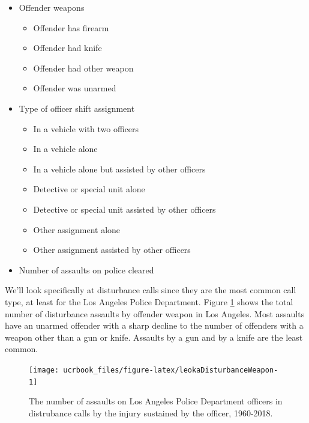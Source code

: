 \documentclass[
  12pt,
  openany]{book}
\providecommand{\tightlist}{%
  \setlength{\itemsep}{0pt}\setlength{\parskip}{0pt}}
\begin{document}
\begin{itemize}
\tightlist
\item
  Offender weapons

  \begin{itemize}
  \tightlist
  \item
    Offender has firearm
  \item
    Offender had knife
  \item
    Offender had other weapon
  \item
    Offender was unarmed
  \end{itemize}
\item
  Type of officer shift assignment

  \begin{itemize}
  \tightlist
  \item
    In a vehicle with two officers
  \item
    In a vehicle alone
  \item
    In a vehicle alone but assisted by other officers
  \item
    Detective or special unit alone
  \item
    Detective or special unit assisted by other officers
  \item
    Other assignment alone
  \item
    Other assignment assisted by other officers
  \end{itemize}
\item
  Number of assaults on police cleared
\end{itemize}

We'll look specifically at disturbance calls since they are the most common call type, at least for the Los Angeles Police Department. Figure \ref{fig:leokaDisturbanceWeapon} shows the total number of disturbance assaults by offender weapon in Los Angeles. Most assaults have an unarmed offender with a sharp decline to the number of offenders with a weapon other than a gun or knife. Assaults by a gun and by a knife are the least common.

\begin{figure}

{\centering \texttt{[image: ucrbook\_files/figure-latex/leokaDisturbanceWeapon-1]} 

}

\caption{The number of assaults on Los Angeles Police Department officers in distrubance calls by the injury sustained by the officer, 1960-2018.}\label{fig:leokaDisturbanceWeapon}
\end{figure}
\end{document}

